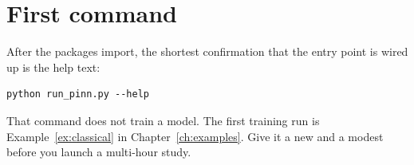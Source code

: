 \section{First command}

After the packages import, the shortest confirmation that the entry point is wired up is the help text:

\begin{lstlisting}[style=sh]
python run_pinn.py --help
\end{lstlisting}

That command does not train a model.
The first training run is Example~\ref{ex:classical} in Chapter~\ref{ch:examples}.
Give it a new  and a modest  before you launch a multi-hour study.
